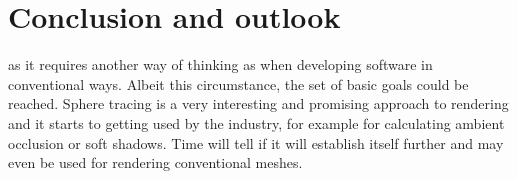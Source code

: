 
\section{Conclusion and outlook}

 as it requires
another way of thinking as when developing software in conventional ways. Albeit
this circumstance, the set of basic goals could be reached. Sphere tracing is a
very interesting and promising approach to rendering and it starts to getting
used by the industry, for example for calculating ambient occlusion or soft
shadows. Time will tell if it will establish itself further and may even be used
for rendering conventional meshes.